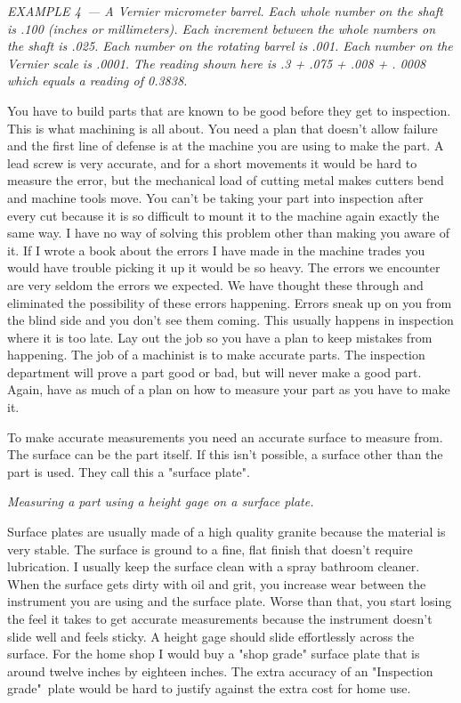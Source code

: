 \textit{EXAMPLE 4\ --- A Vernier micrometer barrel. Each whole number on the
shaft is .100 (inches or millimeters). Each increment between the whole numbers
on the shaft is .025. Each number on the rotating barrel is .001. Each number on
the Vernier scale is .0001. The reading shown here is .3 + .075 + .008 + . 0008
which equals a reading of 0.3838.}
\bigskip

You have to build parts that are known to be good before they get to inspection.
This is what machining is all about. You need a plan that doesn't allow failure
and the first line of defense is at the machine you are using to make the part.
A lead screw is very accurate, and for a short movements it would be hard to
measure the error, but the mechanical load of cutting metal makes cutters bend
and machine tools move. You can't be taking your part into inspection after
every cut because it is so difficult to mount it to the machine again exactly
the same way. I have no way of solving this problem other than making you aware
of it. If I wrote a book about the errors I have made in the machine trades you
would have trouble picking it up it would be so heavy. The errors we encounter
are very seldom the errors we expected. We have thought these through and
eliminated the possibility of these errors happening. Errors sneak up on you
from the blind side and you don't see them coming. This usually happens in
inspection where it is too late. Lay out the job so you have a plan to keep
mistakes from happening. The job of a machinist is to make accurate parts. The
inspection department will prove a part good or bad, but will never make a good
part. Again, have as much of a plan on how to measure your part as you have to
make it.


To make accurate measurements you need an accurate surface to measure from. The
surface can be the part itself. If this isn't possible, a surface other than the
part is used. They call this a "surface plate".

\bigskip
\textit{Measuring a part using a height gage on a surface plate.}
\bigskip

Surface plates are usually made of a high quality granite because the material
is very stable. The surface is ground to a fine, flat finish that doesn't
require lubrication. I usually keep the surface clean with a spray bathroom
cleaner. When the surface gets dirty with oil and grit, you increase wear
between the instrument you are using and the surface plate. Worse than that, you
start losing the feel it takes to get accurate measurements because the
instrument doesn't slide well and feels sticky. A height gage should slide
effortlessly across the surface. For the home shop I would buy a "shop grade"
surface plate that is around twelve inches by eighteen inches. The extra
accuracy of an "Inspection grade"\ plate would be hard to justify against the
extra cost for home use.


